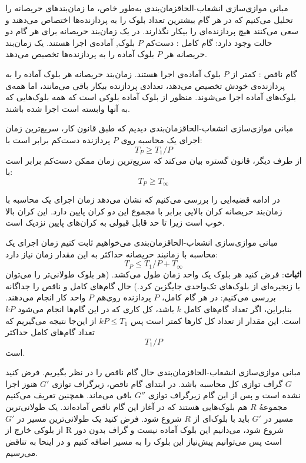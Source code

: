 \begin{itemframe-s}{مبانی موازی‌سازی انشعاب-الحاق}{زمان‌بندی}
\itm
به‌طور خاص، ما زمان‌بندهای حریصانه
را تحلیل می‌کنیم که در هر گام بیشترین تعداد بلوک را به پردازنده‌ها اختصاص می‌دهند و سعی می‌کنند هیچ پردازنده‌ای را بیکار نگذارند.
در یک زمان‌بند حریصانه برای هر گام دو حالت وجود دارد:
\itm[1]
 گام کامل
: دست‌کم $P$ بلوک, آماده‌ی اجرا هستند. یک زمان‌بند حریصانه هر $P$ بلوک آماده را به پردازنده‌ها تخصیص می‌دهد.
\itm[2]

گام ناقص
: کمتر از $P$ بلوک آماده‌ی اجرا هستند. زمان‌بند حریصانه هر بلوک‌ آماده را به پردازنده‌ی خودش تخصیص می‌دهد، تعدادی پردازنده بیکار باقی می‌مانند، اما همه‌ی بلوک‌های آماده اجرا می‌شوند.
\itm
منظور از بلوک آماده بلوکی است که همه بلوک‌هایی که به آنها وابسته است اجرا شده باشند.
\end{itemframe-s}


\begin{itemframe-s}{مبانی موازی‌سازی انشعاب-الحاق}{زمان‌بندی}
\itm
دیدیم که طبق قانون کار، سریع‌ترین زمان اجرای یک محاسبه روی $P$ پردازنده دست‌کم برابر است با:
$$T_P ≥ T_1 / P$$
از طرف دیگر، قانون گستره بیان می‌کند که سریع‌ترین زمان ممکن دست‌کم برابر است با:
$$T_P ≥ T_∞$$
\itm

در ادامه قضیه‌ایی را بررسی می‌کنیم که نشان می‌دهد زمان اجرای یک محاسبه با زمان‌بند حریصانه کران بالایی برابر با مجموع این دو کران پایین دارد.
این کران بالا خوب است زیرا تا حد قابل قبولی به کران‌های پایین نزدیک است.
\end{itemframe-s}


\begin{itemframe-s}{مبانی موازی‌سازی انشعاب-الحاق}{زمان‌بندی}
\itm
می‌خواهیم ثابت کنیم زمان اجرای یک محاسبه با زمانبند حریصانه حداکثر به این مقدار زمان نیاز دارد:
$$T_P ≤ T_1 / P + T_∞$$
\itm
\textbf{اثبات}:
فرض کنید هر بلوک یک واحد زمان طول می‌کشد. (هر بلوک طولانی‌تر را می‌توان با زنجیره‌ای از بلوک‌های تک‌واحدی جایگزین کرد.) حال گام‌های کامل و ناقص را جداگانه بررسی می‌کنیم:
\itm[الف]
در هر گام کامل، $P$ پردازنده روی‌هم $P$ واحد کار انجام می‌دهند. بنابراین، اگر تعداد گام‌های کامل $k$ باشد، کل کاری که در این گام‌ها انجام می‌شود $kP$ است. این مقدار از تعداد کل کارها کمتر است پس
$kP ≤ T_1$
از این‌جا نتیجه می‌گیریم که تعداد گام‌های کامل حداکثر
$$T_1 / P$$
است.
\end{itemframe-s}


\begin{itemframe-s}{مبانی موازی‌سازی انشعاب-الحاق}{زمان‌بندی}
\itm[ب]
حال گام ناقص را در نظر بگیریم. فرض کنید $G$ گراف توازی کل محاسبه باشد.
در ابتدای گام ناقص، زیرگراف توازی
$G'$
هنوز اجرا نشده است و پس از این گام زیرگراف توازی $G''$ باقی می‌ماند.
\sub
همچنین تعریف می‌کنیم مجموعهُ $R$ هم بلوک‌هایی هستند که در آغاز این گام ناقص آماده‌اند.
\sub
یک طولانی‌ترین مسیر در
$G'$
باید با بلوک‌ای از
$R$
شروع شود. فرض کنید یک طولانی‌ترین مسیر در
$G'$
از بلوکی خارج از R شروع شود، می‌دانیم این بلوک آماده نیست و گراف بدون دور است پس می‌توانیم پیش‌نیاز این بلوک را به مسیر اضافه کنیم و در اینحا به تناقض می‌رسیم.

\end{itemframe-s}


